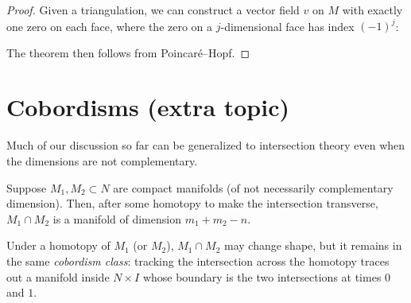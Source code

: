 \begin{proof}
    Given a triangulation, we can construct a vector field $v$ on $M$ with exactly one zero on each face, where the zero on a $j$-dimensional face has index $(-1)^j$:
    \begin{center}
    \end{center}
    The theorem then follows from Poincar\'e--Hopf.
\end{proof}

\section{Cobordisms (extra topic)}

Much of our discussion so far can be generalized to intersection theory even when the dimensions are not complementary.

Suppose $M_1, M_2 \subset N$ are compact manifolds (of not necessarily complementary dimension). Then, after some homotopy to make the intersection transverse, $M_1 \cap M_2$ is a manifold of dimension $m_1 + m_2 - n$.

Under a homotopy of $M_1$ (or $M_2$), $M_1 \cap M_2$ may change shape, but it remains in the same \emph{cobordism class}: tracking the intersection across the homotopy traces out a manifold inside $N \times I$ whose boundary is the two intersections at times $0$ and $1$.

